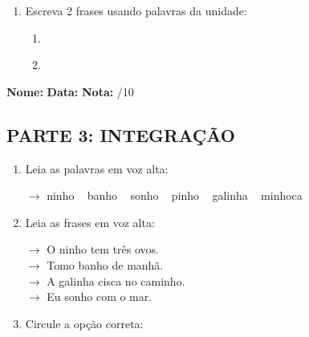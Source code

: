 \begin{exercicio}
\begin{enumerate}[resume]
  \item Escreva 2 frases usando palavras da unidade:
  \begin{enumerate}[label=\alph*)]
    \item \underline{\hspace{8cm}}
    \item \underline{\hspace{8cm}}
  \end{enumerate}

\end{enumerate}

\end{exercicio}



\begin{exercicio}

\noindent\textbf{Nome:} \underline{\hspace{3.2cm}} \quad \textbf{Data:} \underline{\hspace{1.6cm}} \quad \textbf{Nota:} \underline{\hspace{0.9cm}}/10


\subsection*{PARTE 3: INTEGRAÇÃO}

\begin{enumerate}[resume]

  \item Leia as palavras em voz alta:
  \begin{center}
  $\rightarrow$ ninho ~ banho ~ sonho ~ pinho ~ galinha ~ minhoca
  \end{center}

  \item Leia as frases em voz alta:
  \begin{center}
  $\rightarrow$ O ninho tem três ovos.\\
  $\rightarrow$ Tomo banho de manhã.\\
  $\rightarrow$ A galinha cisca no caminho.\\
  $\rightarrow$ Eu sonho com o mar.\\
  \end{center}

  \item Circule a opção correta:
  \begin{enumerate}[label=(\alph*)]


\end{enumerate}
\end{enumerate}
\end{exercicio}
